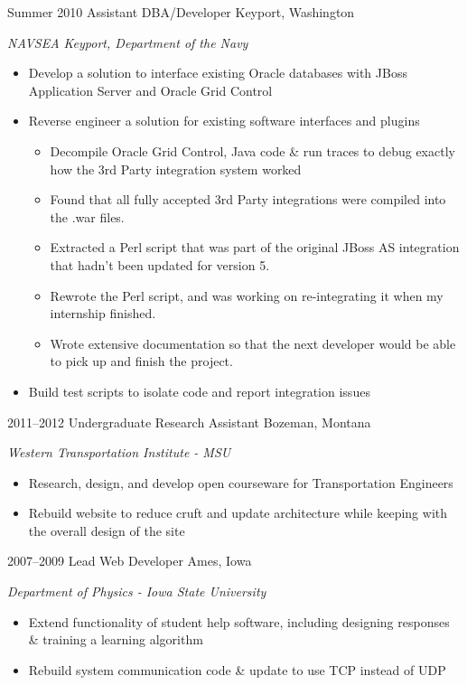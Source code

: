 \documentclass[]{two-column-stats} %
\begin{document}
\begin{entrylist}
\entry
{Summer 2010}
{Assistant DBA/Developer}
{Keyport, Washington}
{\emph{NAVSEA Keyport, Department of the Navy}
\begin{itemize}
  \item Develop a solution to interface existing Oracle databases with JBoss Application Server and Oracle Grid Control
  \item Reverse engineer a solution for existing software interfaces and plugins
  \begin{itemize}
    \item Decompile Oracle Grid Control, Java code \& run traces to debug exactly how the 3rd Party integration system worked
    \item Found that all fully accepted 3rd Party integrations were compiled into the .war files.
    \item Extracted a Perl script that was part of the original JBoss AS integration that hadn't been updated for version 5.
    \item Rewrote the Perl script, and was working on re-integrating it when my internship finished.
    \item Wrote extensive documentation so that the next developer would be able to pick up and finish the project.
  \end{itemize}
  \item Build test scripts to isolate code and report integration issues
\end{itemize}
}
\end{entrylist}
\begin{entrylist}
\entry
{2011--2012}
{Undergraduate Research Assistant}
{Bozeman, Montana}
{\emph{Western Transportation Institute - MSU}
\begin{itemize}
\item Research, design, and develop open courseware for Transportation Engineers
\item Rebuild website to reduce cruft and update architecture while keeping with the overall design of the site
\end{itemize}
}
\end{entrylist}
\begin{entrylist}
\entry
{2007--2009}
{Lead Web Developer}
{Ames, Iowa}
{\emph{Department of Physics - Iowa State University}
\begin{itemize}
\item Extend functionality of student help software, including designing responses \& training a learning algorithm
\item Rebuild system communication code \& update to use TCP instead of UDP
\end{itemize}
}
\end{entrylist}
\end{document}

